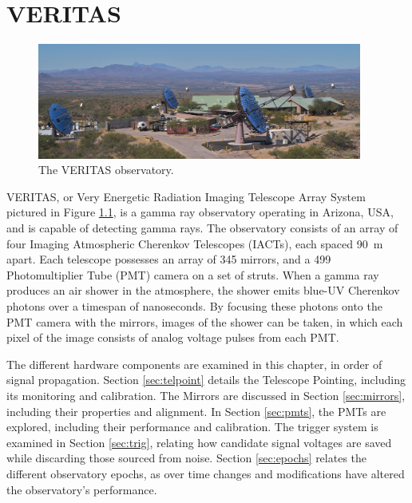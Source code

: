 \cleartooddpage[\thispagestyle{empty}]
\chapter{VERITAS}\label{chapter:veritas}

\begin{figure}[ht]
  \centering
  \includegraphics[width=0.95\textwidth]{images/veritas_array_v6}
  \caption[VERITAS Array]{
    The VERITAS observatory.}
  \label{fig:veritasarray}
\end{figure}

VERITAS, or Very Energetic Radiation Imaging Telescope Array System pictured in Figure \ref{fig:veritasarray}, is a gamma ray observatory operating in Arizona, USA, and is capable of detecting \nicetilde{}\TeV{} gamma rays.
The observatory consists of an array of four Imaging Atmospheric Cherenkov Telescopes (IACTs), each spaced \nicetilde{}\SI{90}{m} apart.
Each telescope possesses an array of 345 mirrors, and a 499 Photomultiplier Tube (PMT) camera on a set of struts.
When a gamma ray produces an air shower in the atmosphere, the shower emits blue-UV Cherenkov photons over a timespan of nanoseconds.
By focusing these photons onto the PMT camera with the mirrors, images of the shower can be taken, in which each pixel of the image consists of analog voltage pulses from each PMT.


The different hardware components are examined in this chapter, in order of signal propagation.
Section \ref{sec:telpoint} details the Telescope Pointing, including its monitoring and calibration.
The Mirrors are discussed in Section \ref{sec:mirrors}, including their properties and alignment.
In Section \ref{sec:pmts}, the PMTs are explored, including their performance and calibration.
The trigger system is examined in Section \ref{sec:trig}, relating how candidate signal voltages are saved while discarding those sourced from noise.
Section \ref{sec:epochs} relates the different observatory epochs, as over time changes and modifications have altered the observatory's performance.


